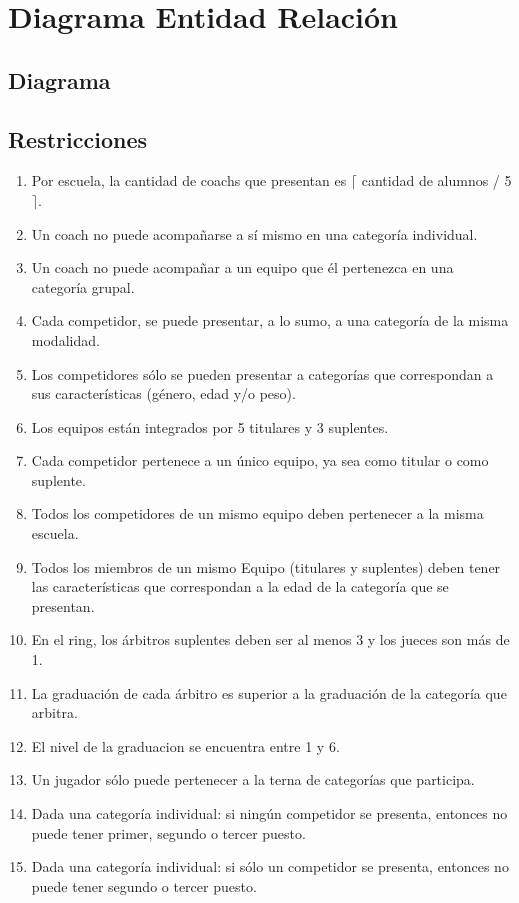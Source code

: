 \section{Diagrama Entidad Relación}
\subsection{Diagrama}
\subsection{Restricciones}

\begin{enumerate}
\item Por escuela, la cantidad de coachs que presentan es $\lceil$ cantidad de alumnos / 5 $\rceil$.
\item Un coach no puede acompañarse a sí mismo en una categor\'ia individual.
\item Un coach no puede acompañar a un equipo que él pertenezca en una categor\'ia grupal.
\item Cada competidor, se puede presentar, a lo sumo, a una categoría de la misma modalidad.
\item Los competidores s\'olo se pueden presentar a categor\'ias que correspondan a sus caracter\'isticas (g\'enero, edad y/o peso).
\item Los equipos están integrados por 5 titulares y 3 suplentes.
\item Cada competidor pertenece a un único equipo, ya sea como titular o como suplente.
\item Todos los competidores de un mismo equipo deben pertenecer a la misma escuela.
\item Todos los miembros de un mismo Equipo (titulares y suplentes) deben tener las caracter\'isticas que correspondan a la edad de la categor\'ia que se presentan.
\item En el ring, los \'arbitros suplentes deben ser al menos 3 y los jueces son m\'as de 1.
\item La graduaci\'on de cada \'arbitro es superior a la graduaci\'on de la categor\'ia que arbitra.
\item El nivel de la graduacion se encuentra entre 1 y 6.
\item Un jugador s\'olo puede pertenecer a la terna de categor\'ias que participa.
\item Dada una categor\'ia individual: si ning\'un competidor se presenta, entonces no puede tener primer, segundo o tercer puesto.
\item Dada una categor\'ia individual: si s\'olo un competidor se presenta, entonces no puede tener segundo o tercer puesto.

\end{enumerate}
